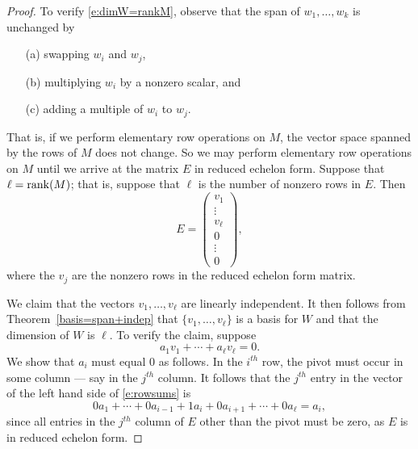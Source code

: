 \documentclass{ximera}
\begin{document}
\begin{proof} To verify \eqref{e:dimW=rankM}, observe that the span of
$w_1,\ldots,w_k$ is unchanged by
\begin{itemize}
\item[(a)] swapping $w_i$ and $w_j$,
\item[(b)] multiplying $w_i$ by a nonzero scalar, and
\item[(c)] adding a multiple of $w_i$ to $w_j$.
\end{itemize}
That is, if we perform elementary row operations on $M$, the
vector space spanned by the rows of $M$ does not change. So we
may perform elementary row operations on $M$ until we arrive at
the matrix $E$ in reduced echelon form.   
Suppose that $\ell={\rm rank}(M)$; that is, suppose that $\ell$
is the number of nonzero rows in $E$.  Then
\[
E =\left(\begin{array}{c} v_1\\ \vdots \\v_\ell\\ 0 \\ \vdots
\\ 0 \end{array}\right),
\]
where the $v_j$ are the nonzero rows in the reduced echelon form
matrix.

We claim that the vectors $v_1,\ldots,v_\ell$ are linearly
independent.  It then follows from Theorem~\ref{basis=span+indep} that
$\{v_1,\ldots,v_\ell\}$ is a basis for $W$ and that the dimension of
$W$ is $\ell$.  To verify the claim, suppose
\begin{equation} \label{e:rowsums}
a_1v_1 + \cdots + a_\ell v_\ell = 0.
\end{equation}
We show that $a_i$ must equal $0$ as follows.  In the $i^{th}$
row, the pivot must occur in some column --- say in the $j^{th}$
column.  It follows that the $j^{th}$ entry in the vector of the
left hand side of \eqref{e:rowsums} is
\[
0a_1 + \cdots + 0a_{i-1} +1a_i + 0a_{i+1} + \cdots + 0a_\ell =
a_i,
\]
since all entries in the $j^{th}$ column of $E$ other than the
pivot must be zero, as $E$ is in reduced echelon form.  \end{proof}
\end{document}
